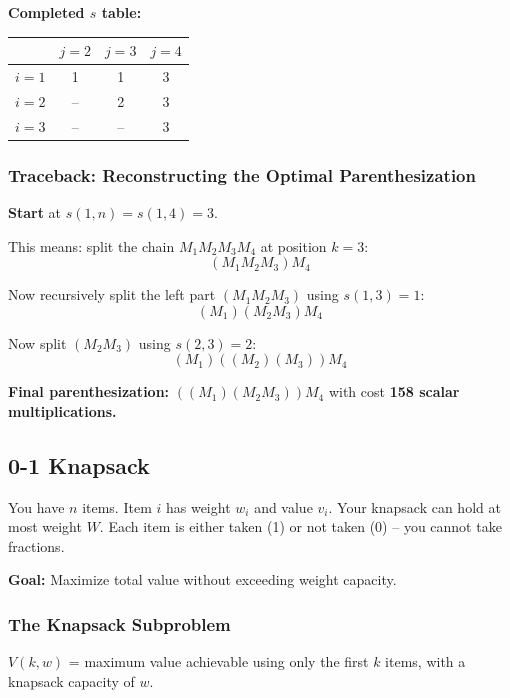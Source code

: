 \documentclass[12pt,portrait]{article}
\begin{document}
\textbf{Completed $s$ table:}

\begin{center}
\begin{tabular}{c|c|c|c}
\toprule
& $j=2$ & $j=3$ & $j=4$ \\
\midrule
$i=1$ & 1 & 1 & 3 \\
$i=2$ & -- & 2 & 3 \\
$i=3$ & -- & -- & 3 \\
\bottomrule
\end{tabular}
\end{center}

\subsubsection{Traceback: Reconstructing the Optimal Parenthesization}

\begin{rulebox}
\textbf{Start} at $s(1,n) = s(1,4) = 3$.

This means: split the chain $M_1 M_2 M_3 M_4$ at position $k=3$:
$$(M_1 M_2 M_3) M_4$$

Now recursively split the left part $(M_1 M_2 M_3)$ using $s(1,3)=1$:
$$(M_1)(M_2 M_3) M_4$$

Now split $(M_2 M_3)$ using $s(2,3)=2$:
$$(M_1)((M_2)(M_3)) M_4$$

\textbf{Final parenthesization:} $((M_1)(M_2 M_3)) M_4$ with cost \textbf{158 scalar multiplications.}
\end{rulebox}

\subsection{0-1 Knapsack}
\label{sec:knapsack}

\begin{rulebox}
You have $n$ items. Item $i$ has weight $w_i$ and value $v_i$. Your knapsack can hold at most weight $W$. Each item is either taken (1) or not taken (0) -- you cannot take fractions.

\textbf{Goal:} Maximize total value without exceeding weight capacity.
\end{rulebox}

\subsubsection{The Knapsack Subproblem}

$V(k, w)$ = maximum value achievable using only the first $k$ items, with a knapsack capacity of $w$.
\end{document}
